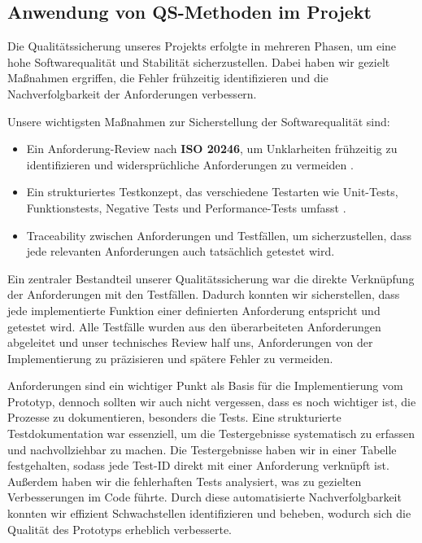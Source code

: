 \subsection{Anwendung von QS-Methoden im Projekt}\label{subsec: anwendung-von-qs-methoden-im-projekt}

Die Qualitätssicherung unseres Projekts erfolgte in mehreren Phasen, um eine hohe Softwarequalität und Stabilität sicherzustellen. 
Dabei haben wir gezielt Maßnahmen ergriffen, die Fehler frühzeitig identifizieren und die Nachverfolgbarkeit der Anforderungen verbessern.

Unsere wichtigsten Maßnahmen zur Sicherstellung der Softwarequalität sind:

\begin{itemize}
    \item Ein Anforderung-Review nach \textbf{ISO 20246}, um Unklarheiten frühzeitig zu identifizieren und widersprüchliche Anforderungen zu vermeiden \cite{Technical-Committee}.
    \item Ein strukturiertes Testkonzept, das verschiedene Testarten wie Unit-Tests, Funktionstests, Negative Tests und Performance-Tests umfasst \cite{Röttgeretal2024}.
    \item Traceability zwischen Anforderungen und Testfällen, um sicherzustellen, dass jede relevanten Anforderungen auch tatsächlich getestet wird.
\end{itemize}

Ein zentraler Bestandteil unserer Qualitätssicherung war die direkte Verknüpfung der Anforderungen mit den Testfällen.
Dadurch konnten wir sicherstellen, dass jede implementierte Funktion einer definierten Anforderung entspricht und getestet wird.
Alle Testfälle wurden aus den überarbeiteten Anforderungen abgeleitet und unser technisches Review half uns, Anforderungen von der Implementierung zu präzisieren und spätere Fehler zu vermeiden.

Anforderungen sind ein wichtiger Punkt als Basis für die Implementierung vom Prototyp, dennoch sollten wir auch nicht vergessen, dass es noch wichtiger ist, die Prozesse zu dokumentieren, besonders die Tests. 
Eine strukturierte Testdokumentation war essenziell, um die Testergebnisse systematisch zu erfassen und nachvollziehbar zu machen.
Die Testergebnisse haben wir in einer Tabelle festgehalten, sodass jede Test-ID direkt mit einer Anforderung verknüpft ist.
Außerdem haben wir die fehlerhaften Tests analysiert, was zu gezielten Verbesserungen im Code führte.
Durch diese automatisierte Nachverfolgbarkeit konnten wir effizient Schwachstellen identifizieren und beheben, wodurch sich die Qualität des Prototyps erheblich verbesserte.

